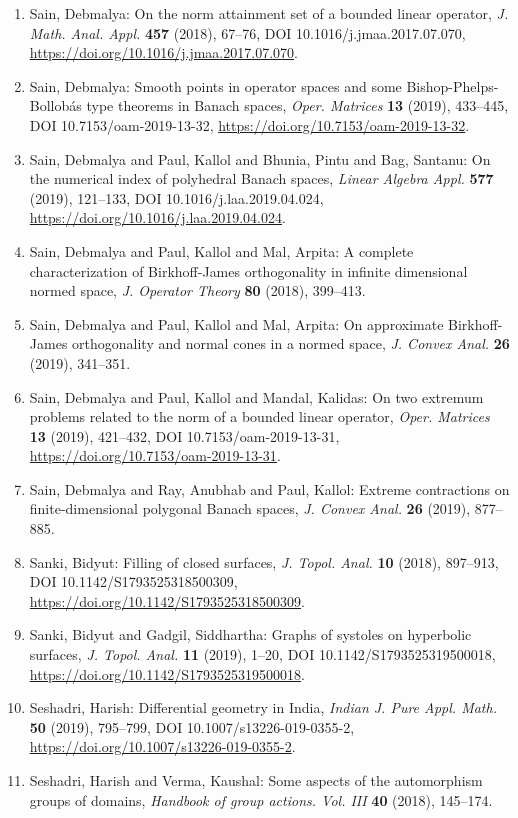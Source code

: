 \begin{enumerate}
\item Sain, Debmalya: On the norm attainment set of a bounded linear operator, \emph{J. Math. Anal. Appl.} {\bf 457} (2018), 67--76, DOI 10.1016/j.jmaa.2017.07.070, \url{https://doi.org/10.1016/j.jmaa.2017.07.070}.
\item Sain, Debmalya: Smooth points in operator spaces and some
{B}ishop-{P}helps-{B}ollob\'{a}s type theorems in {B}anach spaces, \emph{Oper. Matrices} {\bf 13} (2019), 433--445, DOI 10.7153/oam-2019-13-32, \url{https://doi.org/10.7153/oam-2019-13-32}.
\item Sain, Debmalya and Paul, Kallol and Bhunia, Pintu and Bag,
Santanu: On the numerical index of polyhedral {B}anach spaces, \emph{Linear Algebra Appl.} {\bf 577} (2019), 121--133, DOI 10.1016/j.laa.2019.04.024, \url{https://doi.org/10.1016/j.laa.2019.04.024}.
\item Sain, Debmalya and Paul, Kallol and Mal, Arpita: A complete characterization of {B}irkhoff-{J}ames
orthogonality in infinite dimensional normed space, \emph{J. Operator Theory} {\bf 80} (2018), 399--413.
\item Sain, Debmalya and Paul, Kallol and Mal, Arpita: On approximate {B}irkhoff-{J}ames orthogonality and normal
cones in a normed space, \emph{J. Convex Anal.} {\bf 26} (2019), 341--351.
\item Sain, Debmalya and Paul, Kallol and Mandal, Kalidas: On two extremum problems related to the norm of a bounded
linear operator, \emph{Oper. Matrices} {\bf 13} (2019), 421--432, DOI 10.7153/oam-2019-13-31, \url{https://doi.org/10.7153/oam-2019-13-31}.
\item Sain, Debmalya and Ray, Anubhab and Paul, Kallol: Extreme contractions on finite-dimensional polygonal {B}anach
spaces, \emph{J. Convex Anal.} {\bf 26} (2019), 877--885.
\item Sanki, Bidyut: Filling of closed surfaces, \emph{J. Topol. Anal.} {\bf 10} (2018), 897--913, DOI 10.1142/S1793525318500309, \url{https://doi.org/10.1142/S1793525318500309}.
\item Sanki, Bidyut and Gadgil, Siddhartha: Graphs of systoles on hyperbolic surfaces, \emph{J. Topol. Anal.} {\bf 11} (2019), 1--20, DOI 10.1142/S1793525319500018, \url{https://doi.org/10.1142/S1793525319500018}.
\item Seshadri, Harish: Differential geometry in {I}ndia, \emph{Indian J. Pure Appl. Math.} {\bf 50} (2019), 795--799, DOI 10.1007/s13226-019-0355-2, \url{https://doi.org/10.1007/s13226-019-0355-2}.
\item Seshadri, Harish and Verma, Kaushal: Some aspects of the automorphism groups of domains, \emph{Handbook of group actions. {V}ol. {III}} {\bf 40} (2018), 145--174.

\end{enumerate}
